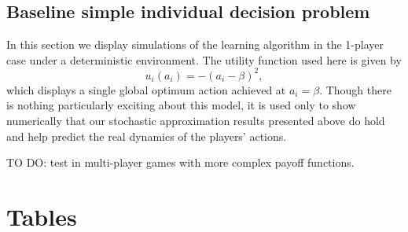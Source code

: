 \documentclass[11pt,reqno]{amsart}
\newcommand{\ac}{a} %
\newcommand{\pf}{u} %
\newcommand{\ba}{\beta} %
\begin{document}
\subsection{Baseline simple individual decision problem}

In this section we display simulations of the learning algorithm in the 1-player case under a deterministic environment. The utility function used here is given by
\begin{equation}
\label{cIndSim}
\pf_i(\ac_i) = - (\ac_i - \ba)^2,
\end{equation}
which displays a single global optimum action achieved at $\ac_i = \ba$. Though there is nothing particularly exciting about this model, it is used only to show numerically that our stochastic approximation results presented above do hold and help predict the real dynamics of the players' actions.

TO DO: test in multi-player games with more complex payoff functions.







\newpage

\section{Tables}
\end{document}
